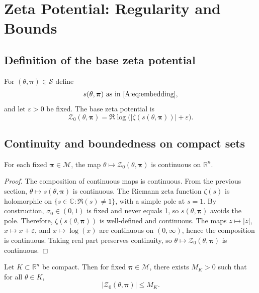 \documentclass[11pt]{article}
\begin{document}
\section{Zeta Potential: Regularity and Bounds}

\subsection{Definition of the base zeta potential}

For $(\theta,\bm{\pi})\in\mathcal{S}$ define
\[
  s(\theta,\bm{\pi}) \text{ as in \eqref{A:eq:embedding}},
\]
and let $\varepsilon>0$ be fixed. The base zeta potential is
\begin{equation}
  \mathcal{Z}_0(\theta,\bm{\pi}) = \Re \log\big(|\zeta(s(\theta,\bm{\pi}))| + \varepsilon\big).
  \label{A:eq:zeta_potential}
\end{equation}

\subsection{Continuity and boundedness on compact sets}

\begin{lemma}
For each fixed $\bm{\pi}\in\mathcal{M}$, the map $\theta\mapsto \mathcal{Z}_0(\theta,\bm{\pi})$ is continuous on $\mathbb{R}^n$.
\end{lemma}

\begin{proof}
The composition of continuous maps is continuous. From the previous section, $\theta\mapsto s(\theta,\bm{\pi})$ is continuous. The Riemann zeta function $\zeta(s)$ is holomorphic on $\{s\in\mathbb{C}: \Re(s)\neq 1\}$, with a simple pole at $s=1$. By construction, $\sigma_0\in(0,1)$ is fixed and never equals 1, so $s(\theta,\bm{\pi})$ avoids the pole. Therefore, $\zeta(s(\theta,\bm{\pi}))$ is well-defined and continuous. The maps $z\mapsto |z|$, $x\mapsto x+\varepsilon$, and $x\mapsto \log(x)$ are continuous on $(0,\infty)$, hence the composition is continuous. Taking real part preserves continuity, so $\theta\mapsto \mathcal{Z}_0(\theta,\bm{\pi})$ is continuous.
\end{proof}

\begin{lemma}
Let $K\subset\mathbb{R}^n$ be compact. Then for fixed $\bm{\pi}\in\mathcal{M}$, there exists $M_K>0$ such that for all $\theta\in K$,
\[
  |\mathcal{Z}_0(\theta,\bm{\pi})| \le M_K.
\]
\end{lemma}
\end{document}
